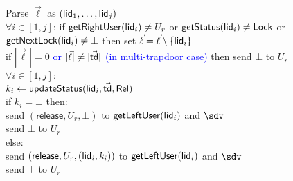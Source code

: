 \begin{figure*}[!h]
{\begin{minipage}[t]{0.50\textwidth}
{				Parse $\vec{\ell}$ as $(\mathsf{lid}_1,\ldots,\mathsf{lid}_j)$							\\
				$\forall i \in [1,j]$: if $\mathsf{getRightUser}(\mathsf{lid}_i) \neq U_r$ or 
				$\mathsf{getStatus}(\mathsf{lid}_i) \neq \mathsf{Lock}$ or 										\\
				$\mathsf{getNextLock}(\mathsf{lid}_i) \neq \bot$ then set $\vec{\ell} = \vec{\ell} \setminus 
				\{\mathsf{lid}_i\}$																\\
				if $|\vec{\ell}| = 0$ \textcolor{blue}{ or $|\vec{\ell}| \neq |\vec{\mathsf{td}}|$ (in 
				multi-trapdoor case)} then send $\bot$ to $U_r$							\\
				$\forall i \in [1,j]$: 													\\
				\quad $k_i \gets \mathsf{updateStatus}(\mathsf{lid}_i, \vec{\mathsf{td}}, \mathsf{Rel})$					\\
				\quad if $k_i = \bot$ then:												\\
				\qquad send $(\mathsf{release},U_r,\bot)$ to $\mathsf{getLeftUser}(\mathsf{lid}_i)$ and 
				$\sdv$																	\\
				\qquad send $\bot$ to $U_r$												\\
				\quad else:																\\
				\qquad send $(\mathsf{release},U_r,(\mathsf{lid}_i, k_i))$ to $\mathsf{getLeftUser}(\mathsf{lid}_i)$ and 
				$\sdv$																	\\
				\qquad send $\top$ to $U_r$
			}
		\end{minipage}
		\begin{minipage}[t]{0.45\textwidth}
\end{minipage}}
\end{figure*}

